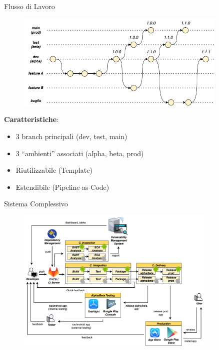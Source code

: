 \begin{frame}{Flusso di Lavoro}
    \begin{figure}[H]
        \includegraphics[width=0.9\textwidth]{img/branching-model.png}
    \end{figure}

    \textbf{Caratteristiche}:
    \begin{itemize}
        \item 3 branch principali (dev, test, main)
        \item 3 ``ambienti'' associati (alpha, beta, prod)
        \item Riutilizzabile (Template)
        \item Estendibile (Pipeline-as-Code)
    \end{itemize}
\end{frame}

\begin{frame}{Sistema Complessivo}

    \begin{figure}[H]
        \includegraphics[width=0.85\textwidth]{img/full-cicd.png}
    \end{figure}

\end{frame}